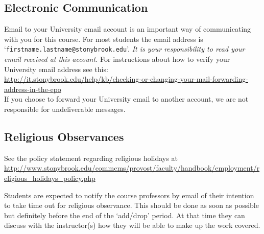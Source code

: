 \documentclass[10pt]{article}
\begin{document}
\subsection{Electronic Communication}

Email to your University email account is an important way
of communicating with you for this course.  For most students the
email address is `{\tt firstname.lastname@stonybrook.edu}'.
{\em It is your responsibility to read your email received at this
  account.}  For instructions about how to verify your University
email address see this: \\[0.25em]
{\small \url{http://it.stonybrook.edu/help/kb/checking-or-changing-your-mail-forwarding-address-in-the-epo}}\\
If you choose to forward your University email to another account, we
are not responsible for undeliverable messages.

\subsection{Religious Observances}

See the policy statement regarding religious holidays at\hfill\\
{\small \url{http://www.stonybrook.edu/commcms/provost/faculty/handbook/employment/religious_holidays_policy.php}} \linebreak
%

Students are expected to notify the course professors by email of
their intention to take time out for religious observance.  This
should be done as soon as possible but definitely before the end of
the `add/drop' period.  At that time they can discuss with the
instructor(s) how they will be able to make up the work covered.
\end{document}
